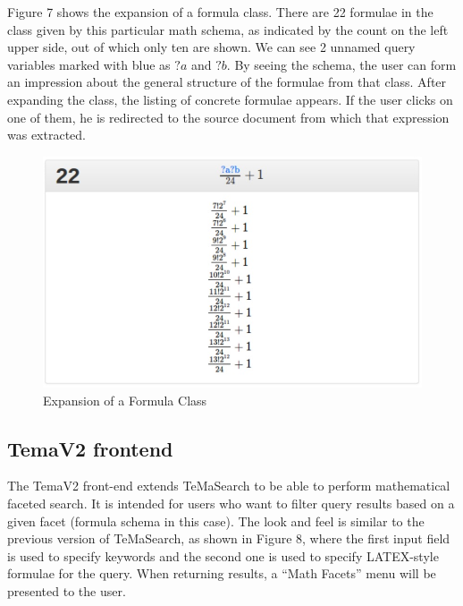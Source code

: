 \documentclass{deliverablereport}
\begin{document}
Figure 7 shows the expansion of a formula class. There are 22 formulae in the class given by this particular math schema, as indicated by the count on the left upper side, out of which only ten are shown. We can see 2 unnamed query variables marked with blue as $?a$ and $?b$. By seeing the schema, the user can form an impression about the general structure of the formulae from that class. After expanding the class, the listing of concrete formulae appears. If the user clicks on one of them, he is redirected to the source document from which that expression was extracted. 

\begin{figure}[H]
\centering
 \includegraphics[scale=0.8]{figure7.jpg}
 \caption{Expansion of a Formula Class}
\end{figure}

\subsection{TemaV2 frontend}\label{v2}

The TemaV2 front-end extends TeMaSearch to be able to perform mathematical faceted search. It is intended for users who want to filter query results based on a given facet (formula schema in this case). The look and feel is similar to the previous version of TeMaSearch, as shown in Figure 8, where the first input field is used to specify keywords and the second one is used to specify LATEX-style formulae for the query. When returning results, a “Math Facets” menu will be presented to the user. ~\cite{Ham:bcs15} 
\end{document}
